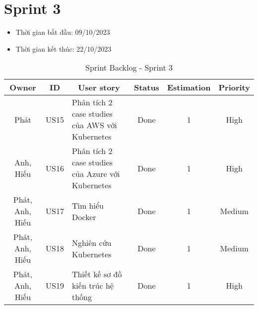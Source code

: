 \section{Sprint 3}
\begin{itemize}
    \item Thời gian bắt đầu: 09/10/2023
    \item Thời gian kết thúc: 22/10/2023
\end{itemize}
\begin{table}[H]
    \begin{tabular}{|c|c|m{6cm}|c|c|c|}
    \hline
    \textbf{Owner} & \textbf{ID} & \multicolumn{1}{c|}{\textbf{User story}}                                & \textbf{Status} & \textbf{Estimation} & \textbf{Priority} \\ \hline
    Phát           & US15        & Phân tích 2 case studies của AWS với Kubernetes                       & Done            & 1                   & High           \\ \hline
    Anh, Hiếu           & US16        & Phân tích 2 case studies của Azure với Kubernetes                       & Done            & 1                   & High           \\ \hline
    Phát, Anh, Hiếu            & US17        & Tìm hiểu Docker                       & Done            & 1                   & Medium          \\ \hline
    Phát, Anh, Hiếu           & US18        & Nghiên cứu Kubernetes                       & Done            & 1                   & Medium          \\ \hline
    Phát, Anh, Hiếu           & US19        & Thiết kế sơ đồ kiến trúc hệ thống                       & Done            & 1                   & High           \\ \hline
    \end{tabular}
    \caption{Sprint Backlog - Sprint 3}
    \label{tab:sprint-3}
\end{table}
